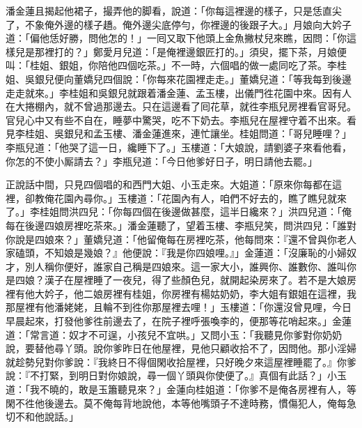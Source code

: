 潘金蓮且揭起他裙子，撮弄他的脚看，說道：「你每這裡邊的樣子，只是恁直尖了，不象俺外邊的樣子趫。俺外邊尖底停勻，你裡邊的後跟子大。」{}月娘向大妗子道：「偏他恁好勝，問他怎的！」一囘又取下他頭上金魚撇杖兒來瞧，因問：「你這樣兒是那裡打的？」鄭愛月兒道：「是俺裡邊銀匠打的。」須臾，擺下茶，月娘便叫：「桂姐、銀姐，你陪他四個吃茶。」不一時，六個唱的做一處同吃了茶。李桂姐、吳銀兒便向董嬌兒四個說：「你每來花園裡走走。」董嬌兒道：「等我每到後邊走走就來。」{}李桂姐和吳銀兒就跟着潘金蓮、孟玉樓，出儀門徃花園中來。因有人在大捲棚內，就不曾過那邊去。只在這邊看了囘花草，就徃李瓶兒房裡看官哥兒。官兒心中又有些不自在，睡夢中驚哭，吃不下奶去。李瓶兒在屋裡守着不出來。看見李桂姐、吳銀兒和孟玉樓、潘金蓮進來，連忙讓坐。桂姐問道：「哥兒睡哩？」李瓶兒道：「他哭了這一日，纔睡下了。」玉樓道：「大娘說，請劉婆子來看他看，你怎的不使小厮請去？」李瓶兒道：「今日他爹好日子，明日請他去罷。」

正說話中間，只見四個唱的和西門大姐、小玉走來。大姐道：「原來你每都在這裡，卻教俺花園內尋你。」玉樓道：「花園內有人，咱們不好去的，瞧了瞧兒就來了。」李桂姐問洪四兒：「你每四個在後邊做甚麼，這半日纔來？」洪四兒道：「俺每在後邊四娘房裡吃茶來。」潘金蓮聽了，望着玉樓、李瓶兒笑，問洪四兒：「誰對你說是四娘來？」董嬌兒道：「他留俺每在房裡吃茶，他每問來：『還不曾與你老人家磕頭，不知娘是幾娘？』他便說：『我是你四娘哩。』」金蓮道：「沒廉恥的小婦奴才，別人稱你便好，誰家自己稱是四娘來。這一家大小，誰興你、誰數你、誰叫你是四娘？漢子在屋裡睡了一夜兒，得了些顏色兒，就開起染房來了。若不是大娘房裡有他大妗子，他二娘房裡有桂姐，你房裡有楊姑奶奶，李大姐有銀姐在這裡，我那屋裡有他潘姥姥，且輪不到徃你那屋裡去哩！」{}{}玉樓道：「你還沒曾見哩，今日早晨起來，打發他爹徃前邊去了，在院子裡呼張喚李的，便那等花哨起來。」金蓮道：「常言道：奴才不可逞，小孩兒不宜哄。」{}又問小玉：「我聽見你爹對你奶奶說，要替他尋丫頭。說你爹昨日在他屋裡，見他只顧收拾不了，因問他。那小淫婦就趁勢兒對你爹說：『我終日不得個閑收拾屋裡，只好晚夕來這屋裡睡罷了。』你爹說：『不打緊，到明日對你娘說，尋一個丫頭與你使便了。』真個有此話？」{}小玉道：「我不曉的，敢是玉簫聽見來？」金蓮向桂姐道：「你爹不是俺各房裡有人，等閑不徃他後邊去。莫不俺每背地說他，本等他嘴頭子不達時務，慣傷犯人，俺每急切不和他說話。」{}


